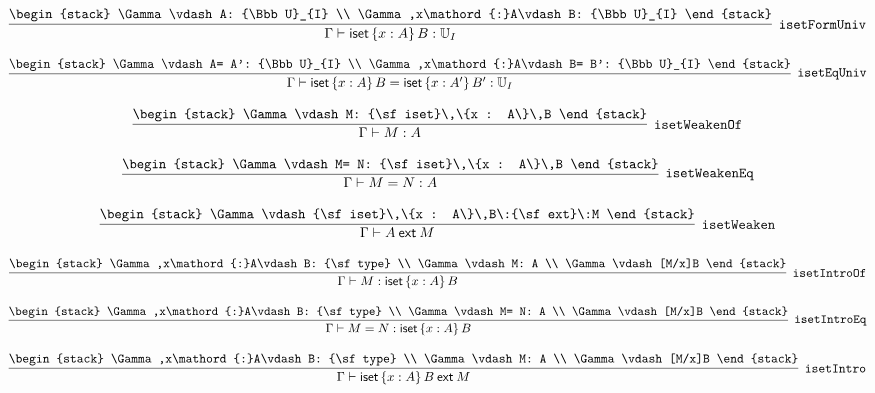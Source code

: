 \[
\infer[{\tt isetFormUniv}]{\Gamma \vdash {\sf iset}\,\{x : A\}\,B: {\Bbb U}_{I}}{
\begin{stack}
\Gamma \vdash A: {\Bbb U}_{I}
\\
\Gamma ,x\mathord{:}A\vdash B: {\Bbb U}_{I}
\end{stack}}
\]

\[
\infer[{\tt isetEqUniv}]{\Gamma \vdash {\sf iset}\,\{x : A\}\,B= {\sf iset}\,\{x : A'\}\,B': {\Bbb U}_{I}}{
\begin{stack}
\Gamma \vdash A= A': {\Bbb U}_{I}
\\
\Gamma ,x\mathord{:}A\vdash B= B': {\Bbb U}_{I}
\end{stack}}
\]

\[
\infer[{\tt isetWeakenOf}]{\Gamma \vdash M: A}{
\begin{stack}
\Gamma \vdash M: {\sf iset}\,\{x : A\}\,B
\end{stack}}
\]

\[
\infer[{\tt isetWeakenEq}]{\Gamma \vdash M= N: A}{
\begin{stack}
\Gamma \vdash M= N: {\sf iset}\,\{x : A\}\,B
\end{stack}}
\]

\[
\infer[{\tt isetWeaken}]{\Gamma \vdash A\:{\sf ext}\:M}{
\begin{stack}
\Gamma \vdash {\sf iset}\,\{x : A\}\,B\:{\sf ext}\:M
\end{stack}}
\]

\[
\infer[{\tt isetIntroOf}]{\Gamma \vdash M: {\sf iset}\,\{x : A\}\,B}{
\begin{stack}
\Gamma ,x\mathord{:}A\vdash B: {\sf type}
\\
\Gamma \vdash M: A
\\
\Gamma \vdash [M/x]B
\end{stack}}
\]

\[
\infer[{\tt isetIntroEq}]{\Gamma \vdash M= N: {\sf iset}\,\{x : A\}\,B}{
\begin{stack}
\Gamma ,x\mathord{:}A\vdash B: {\sf type}
\\
\Gamma \vdash M= N: A
\\
\Gamma \vdash [M/x]B
\end{stack}}
\]

\[
\infer[{\tt isetIntro}]{\Gamma \vdash {\sf iset}\,\{x : A\}\,B\:{\sf ext}\:M}{
\begin{stack}
\Gamma ,x\mathord{:}A\vdash B: {\sf type}
\\
\Gamma \vdash M: A
\\
\Gamma \vdash [M/x]B
\end{stack}}
\]

